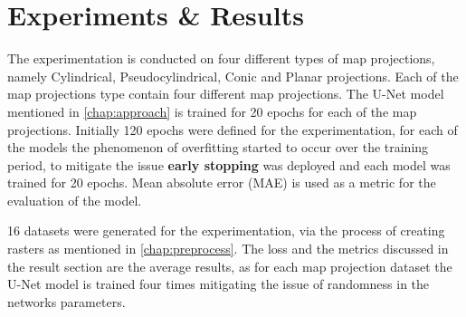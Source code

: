 
\clearpage
\cleardoublepage

\chapter{Experiments \& Results}

\label{chap:experiments_results}
The experimentation is conducted on four different types of map projections, namely Cylindrical, Pseudocylindrical, Conic and Planar projections. Each of the map projections type contain four different map projections.
The U-Net model mentioned in \autoref{chap:approach} is trained for 20 epochs for each of the map projections. Initially 120 epochs were defined for the experimentation, for each of the models the phenomenon of overfitting started to occur over the training period, to mitigate the issue \textbf{early stopping} was deployed and each model was trained for 20 epochs.
Mean absolute error (MAE) is used as a metric for the evaluation of the model.

16 datasets were generated for the experimentation, via the process of creating rasters as mentioned in \autoref{chap:preprocess}. The loss and the metrics discussed in the result section are the average results, as for each map projection dataset the U-Net model is trained four times mitigating the issue of randomness in the networks parameters.

\clearpage

\clearpage

\clearpage


\clearpage


